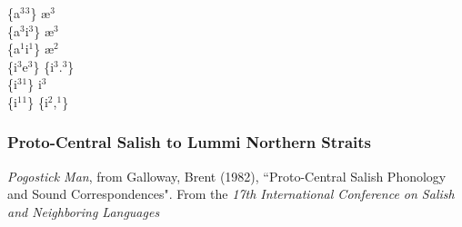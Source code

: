 \documentclass[11pt]{article}
\begin{document}
\{a$^3$\raisebox{-0.7ex}{\textasciitilde}$^3$\} \textrightarrow\hspace{0pt} \ae$^3$ \\
\{a$^3$\raisebox{-0.7ex}{\textasciitilde}i$^3$\} \textrightarrow\hspace{0pt} \ae$^3$ \\
\{a$^1$\raisebox{-0.7ex}{\textasciitilde}i$^1$\} \textrightarrow\hspace{0pt} \ae$^2$ \\
\{i$^3$\raisebox{-0.7ex}{\textasciitilde}e$^3$\} \textrightarrow\hspace{0pt} \{i$^3$.$^3$\} \\
\{i$^3$\raisebox{-0.7ex}{\textasciitilde}$^1$\} \textrightarrow\hspace{0pt} i$^3$ \\
\{i$^1$\raisebox{-0.7ex}{\textasciitilde}$^1$\} \textrightarrow\hspace{0pt} \{i$^2$,$^1$\}

\subsubsection{Proto-Central Salish to Lummi Northern Straits}\textit{Pogostick Man}, from Galloway, Brent (1982), \textquotedblleft Proto-Central Salish Phonology and Sound Correspondences". From the \textit{17th International Conference on Salish and Neighboring Languages}
\end{document}
